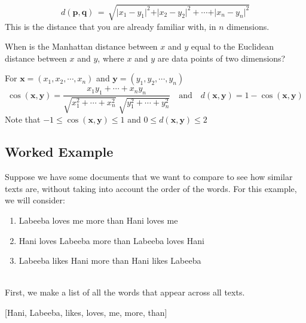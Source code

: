 \documentclass[11pt,fleqn]{book} %
\begin{document}
\begin{definition}
\begin{equation*}
	d(\mathbf{p},\mathbf{q}) \, = \, \sqrt{\vert x_1 - y_1 \vert^2 + \vert x_2 - y_2 \vert^2 + \cdots + \vert x_n - y_n \vert^2}
\end{equation*}
This is the distance that you are already familiar with, in $n$ dimensions.
\end{definition}

\begin{exercise}
When is the Manhattan distance between $x$ and $y$ equal to the Euclidean distance between $x$ and $y$, where $x$ and $y$ are data points of two dimensions?
\end{exercise}

\begin{definition}
For $\mathbf{x} = (x_1, x_2, \cdots, x_n)$ and $\mathbf{y} = (y_1, y_2, \cdots, y_n)$
\begin{equation*}
	\cos(\mathbf{x}, \mathbf{y}) = \frac{x_1y_1 + \cdots + x_ny_n}{\sqrt{x_1^2 + \cdots + x_n^2} \; \sqrt{y_1^2 + \cdots + y_n^2}} \quad \text{and} \quad d(\mathbf{x}, \mathbf{y}) = 1 - \cos(\mathbf{x}, \mathbf{y})
\end{equation*}
Note that $-1 \leq \cos(\mathbf{x}, \mathbf{y}) \leq 1$ and $0 \leq d(\mathbf{x}, \mathbf{y}) \leq 2$
\end{definition}

\newpage

\subsection*{Worked Example}
Suppose we have some documents that we want to compare to see how similar texts are, without taking into account the order of the words. For this example, we will consider:\\

\begin{enumerate}[label=(\alph*)]
	\item Labeeba loves me more than Hani loves me
	\item Hani loves Labeeba more than Labeeba loves Hani
	\item Labeeba likes Hani more than Hani likes Labeeba
\end{enumerate}

\ \\ \noindent
First, we make a list of all the words that appear across all texts.
\begin{center}
	[Hani, Labeeba, likes, loves, me, more, than]
\end{center}
\end{document}

